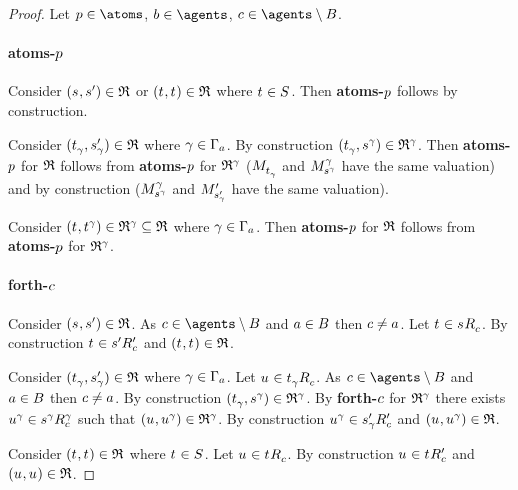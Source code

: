 \begin{proof}
Let $\atomP \in \atoms$, $\agentB \in \agents$, $\agentC \in \agents \setminus \agentsB$.

\paragraph{atoms-$\atomP$}
Consider $(\kStateS, \kStateSP) \in \refinement$ or $(\kStateT, \kStateT) \in \refinement$ where $\kStateT \in \kStates$.
Then {\bf atoms-$\atomP$} follows by construction.

Consider $(\kStateT_\gamma, \kStateSP_\gamma) \in \refinement$ where $\gamma \in \Gamma_\agentA$.
By construction $(\kStateT_\gamma, \kStateS[\gamma]) \in \refinement^\gamma$.
Then {\bf atoms-$\atomP$} for $\refinement$ follows from {\bf atoms-$\atomP$} for $\refinement^\gamma$ ($\kPModel{\kStateT_\gamma}$ and $\kPModel[\gamma]{\kStateS[\gamma]}$ have the same valuation) and by construction ($\kPModel[\gamma]{\kStateS[\gamma]}$ and $\kPModelP{\kStateSP_\gamma}$ have the same valuation).

Consider $(\kStateT, \kStateT[\gamma]) \in \refinement^\gamma \subseteq \refinement$ where $\gamma \in \Gamma_\agentA$.
Then {\bf atoms-$\atomP$} for $\refinement$ follows from {\bf atoms-$\atomP$} for $\refinement^\gamma$.

\paragraph{forth-$\agentC$}
Consider $(\kStateS, \kStateSP) \in \refinement$.
As $\agentC \in \agents \setminus \agentsB$ and $\agentA \in \agentsB$ then $\agentC \neq \agentA$.
Let $\kStateT \in \kSuccessorsC{\kStateS}$.
By construction $\kStateT \in \kSuccessorsPC{\kStateSP}$ and $(\kStateT, \kStateT) \in \refinement$.

Consider $(\kStateT_\gamma, \kStateSP_\gamma) \in \refinement$ where $\gamma \in \Gamma_\agentA$.
Let $\kStateU \in \kSuccessorsC{\kStateT_\gamma}$.
As $\agentC \in \agents \setminus \agentsB$ and $\agentA \in \agentsB$ then $\agentC \neq \agentA$.
By construction $(\kStateT_\gamma, \kStateS[\gamma]) \in \refinement^\gamma$.
By {\bf forth-$\agentC$} for $\refinement^\gamma$ there exists $\kStateU[\gamma] \in \kSuccessorsC[\gamma]{\kStateS[\gamma]}$ such that $(\kStateU, \kStateU[\gamma]) \in \refinement^\gamma$.
By construction $\kStateU[\gamma] \in \kSuccessorsPC{\kStateSP_\gamma}$ and $(\kStateU, \kStateU[\gamma]) \in \refinement$.

Consider $(\kStateT, \kStateT) \in \refinement$ where $\kStateT \in \kStates$.
Let $\kStateU \in \kSuccessorsC{\kStateT}$.
By construction $\kStateU \in \kSuccessorsPC{\kStateT}$ and $(\kStateU, \kStateU) \in \refinement$.


\end{proof}
